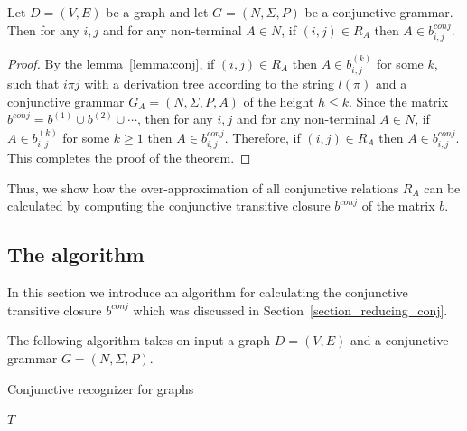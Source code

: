 \begin{mytheorem}\label{thm:correct_conj}
    Let $D = (V,E)$ be a graph and let $G =(N,\Sigma,P)$ be a conjunctive grammar. Then for any $i, j$ and for any non-terminal $A \in N$, if $(i,j) \in R_A$ then $A \in b^{conj}_{i,j}$.
\end{mytheorem}
\begin{proof}
    
    By the lemma~\ref{lemma:conj}, if $(i,j) \in R_A$ then $A \in b^{(k)}_{i,j}$ for some $k$, such that $i \pi j$ with a derivation tree according to the string $l(\pi)$ and a conjunctive grammar $G_A = (N,\Sigma,P,A)$ of the height $h \leq k$. Since the matrix $b^{conj} = b^{(1)} \cup b^{(2)} \cup \cdots$, then for any $i, j$ and for any non-terminal $A \in N$, if $A \in b^{(k)}_{i,j}$ for some $k \geq 1$ then  $A \in b^{conj}_{i,j}$. Therefore, if $(i,j) \in R_A$ then $A \in b^{conj}_{i,j}$. This completes the proof of the theorem.
\end{proof}

Thus, we show how the over-approximation of all conjunctive relations $R_A$ can be calculated by computing the conjunctive transitive closure $b^{conj}$ of the matrix $b$.



\subsection{The algorithm} \label{section_algorithm_conj}
In this section we introduce an algorithm for calculating the conjunctive transitive closure $b^{conj}$ which was discussed in Section~\ref{section_reducing_conj}.

The following algorithm takes on input a graph $D = (V, E)$ and a conjunctive grammar $G = (N,\Sigma,P)$.

\begin{algorithm}[H]
    \begin{algorithmic}[1]
        \caption{Conjunctive recognizer for graphs}
        \label{alg:graphParse_conj}
        
        \EndFor    
        
        \EndWhile
        \State \Return $T$    
        \EndFunction
    \end{algorithmic}
\end{algorithm}

